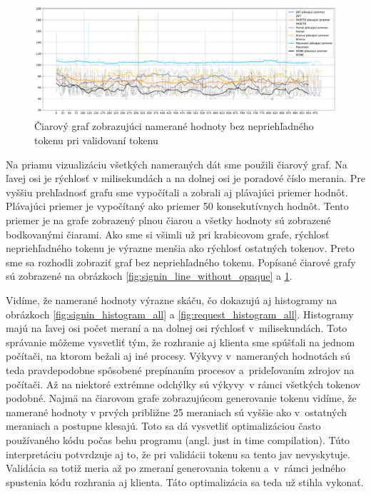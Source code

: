 \begin{figure}[H]
  \centerline{\includegraphics[width=1\textwidth]{images/request_line_without_opaque}}
  \caption[Čiarový graf -- validácia, hodnoty bez nepriehľadného tokenu]{Čiarový graf zobrazujúci namerané hodnoty bez nepriehľadného tokenu pri validovaní tokenu}
  \label{fig:request_line_without_opaque}
\end{figure}

Na priamu vizualizáciu všetkých nameraných dát sme použili čiarový graf. Na ľavej osi je rýchlosť v milisekundách a na dolnej osi je poradové číslo merania. Pre vyššiu prehľadnosť grafu sme vypočítali a zobrali aj plávajúci priemer hodnôt. Plávajúci priemer je vypočítaný ako priemer 50 konsekutívnych hodnôt. Tento priemer je na grafe zobrazený plnou čiarou a všetky hodnoty sú zobrazené bodkovanými čiarami. Ako sme si všimli už pri krabicovom grafe, rýchlosť nepriehľadného tokenu je výrazne menšia ako rýchlosť ostatných tokenov. Preto sme sa rozhodli zobraziť graf bez nepriehľadného tokenu. Popísané čiarové grafy sú zobrazené na obrázkoch \ref{fig:signin_line_without_opaque} a \ref{fig:request_line_without_opaque}.


Vidíme, že namerané hodnoty výrazne skáču, čo dokazujú aj histogramy na obrázkoch \ref{fig:signin_histogram_all} a \ref{fig:request_histogram_all}. Histogramy majú na ľavej osi počet meraní a na dolnej osi rýchlosť v~milisekundách. Toto správanie môžeme vysvetliť tým, že rozhranie aj klienta sme spúšťali na jednom počítači, na ktorom bežali aj iné procesy. Výkyvy v~nameraných hodnotách sú teda pravdepodobne spôsobené prepínaním procesov a~prideľovaním zdrojov na počítači. Až na niektoré extrémne odchýlky sú výkyvy~v rámci všetkých tokenov podobné. Najmä na čiarovom grafe zobrazujúcom generovanie tokenu vidíme, že namerané hodnoty v prvých približne 25 meraniach sú vyššie ako v~ostatných meraniach a postupne klesajú. Toto sa dá vysvetliť optimalizáciou často používaného kódu počas behu programu (angl. just in time compilation). Túto interpretáciu potvrdzuje aj to, že pri validácii tokenu sa tento jav nevyskytuje. Validácia sa totiž meria až po zmeraní generovania tokenu a~v~rámci jedného spustenia kódu rozhrania aj klienta. Táto optimalizácia sa teda už stihla vykonať.


